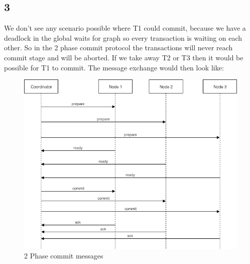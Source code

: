 \subsection{3}
We don't see any scenario possible where T1 could commit, because we have a deadlock in the global waits for graph so every transaction is waiting on each other.
So in the 2 phase commit protocol the transactions will never reach commit stage and will be aborted.
If we take away T2 or T3 then it would be possible for T1 to commit.
The message exchange would then look like:
\begin{figure}[htb!]
	\includegraphics[width=\textwidth]{img/2pcp}
	\caption{2 Phase commit messages}
\end{figure}